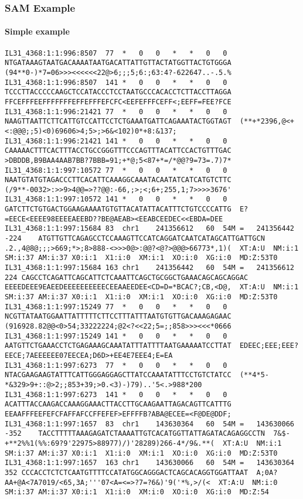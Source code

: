 \documentclass{beamer}
\begin{document}
\begin{frame}[fragile]
\frametitle{SAM Example}
\framesubtitle{Simple example}
\begin{framed}\tiny
\begin{verbatim}
IL31_4368:1:1:996:8507	77	*	0	0	*	*	0	0	NTGATAAAGTAATGACAAAATAATGACATTATTGTTACTATGGTTACTGTGGGA	(94**0-)*7=06>>><<<<<<22@>6;;;5;6:;63:4?-622647..-.5.%
IL31_4368:1:1:996:8507	141	*	0	0	*	*	0	0	TCCCTTACCCCCAAGCTCCATACCCTCCTAATGCCCACACCTCTTACCTTAGGA	FFCEFFFEEFFFFFFFEFFEFFFEFCFC<EEFEFFFCEFF<;EEFF=FEE?FCE
IL31_4368:1:1:996:21421	77	*	0	0	*	*	0	0	NAAGTTAATTCTTCATTGTCCATTCCTCTGAAATGATTCAGAAATACTGGTAGT	(**+*2396,@<+<:@@@;;5)<0)69606>4;5>;>6&<102)0*+8:&137;
IL31_4368:1:1:996:21421	141	*	0	0	*	*	0	0	CAAAAACTTTCACTTTACCTGCCGGGTTTCCCAGTTTACATTCCACTGTTTGAC	>DBDDB,B9BAA4AAB7BB?7BBB=91;+*@;5<87+*=/*@@?9=73=.7)7*
IL31_4368:1:1:997:10572	77	*	0	0	*	*	0	0	NAATGTATGTAGACCCTTCACATTCAAAGGCAAATACAATATCATCATGTCTTC	(/9**-0032>:>>9>4@@=>??@@:-66,;>;<;6+;255,1;7>>>>3676'
IL31_4368:1:1:997:10572	141	*	0	0	*	*	0	0	GATCTTCTGTGACTGGAAGAAAATGTGTTACATATTACATTTCTGTCCCCATTG	E?=EECE<EEEE98EEEEAEEBD??BE@AEAB><EEABCEEDEC<<EBDA=DEE
IL31_4368:1:1:997:15684	83	chr1	241356612	60	54M	=	241356442	-224	ATGTTGTTCAGAGCCTCCAAAGTTCCATCAGGATCAATCATAGCATTGATTGCN	.2.,4@8@;;;>669;*>;8>888-<>>>0@>:@@?<@?>@@@>66773*,1)(	XT:A:U	NM:i:1	SM:i:37	AM:i:37	X0:i:1	X1:i:0	XM:i:1	XO:i:0	XG:i:0	MD:Z:53T0
IL31_4368:1:1:997:15684	163	chr1	241356442	60	54M	=	241356612	224	CAGCCTCAGATTCAGCATTCTCAAATTCAGCTGCGGCTGAAACAGCAGCAGGAC	EEEEDEEE9EAEEDEEEEEEEEEECEEAAEEDEE<CD=D=*BCAC?;CB,<D@,	XT:A:U	NM:i:1	SM:i:37	AM:i:37	X0:i:1	X1:i:0	XM:i:1	XO:i:0	XG:i:0	MD:Z:53T0
IL31_4368:1:1:997:15249	77	*	0	0	*	*	0	0	NCGTTATAATGGAATTATTTTTCTTCCTTTATTTAATGTGTTGACAAAGAGAAC	(916928.82@@<0>54;33222224;@2<?<<22;5=;;858>>><<<*0666
IL31_4368:1:1:997:15249	141	*	0	0	*	*	0	0	AATGTTCTGAAACCTCTGAGAAAGCAAATATTTATTTTAATGAAAAATCCTTAT	EDEEC;EEE;EEE?EECE;7AEEEEEE07EECEA;D6D>+EE4E7EEE4;E=EA
IL31_4368:1:1:997:6273	77	*	0	0	*	*	0	0	NTACGAAGAAGTATTTCATTGGGAGGAGCTTATCCAAATATTTCCTGTCTATCC	(**4*5-*&329>9+::@>2;;853+39;>0.<3)-)79)..'5<.>988*200
IL31_4368:1:1:997:6273	141	*	0	0	*	*	0	0	ACATTTACCAAGACCAAAGGAAACTTACCTTGCAAGAATTAGACAGTTCATTTG	EEAAFFFEEFEFCFAFFAFCCFFEFEF>EFFFFB?ABA@ECEE=<F@DE@DDF;
IL31_4368:1:1:997:1657	83	chr1	143630364	60	54M	=	143630066	-352	TACCTTTTTAAAGAGATCTAAAATTGTCACATGGTTATTAGATACAGAGGCCTN	7&$-+**2%%1(%%:69?9'22975>88977)/)'28289)266-4*/9&.**(	XT:A:U	NM:i:1	SM:i:37	AM:i:37	X0:i:1	X1:i:0	XM:i:1	XO:i:0	XG:i:0	MD:Z:53T0
IL31_4368:1:1:997:1657	163	chr1	143630066	60	54M	=	143630364	352	CCCACCTCTCTCAATGTTTTCCATATGGCAGGGACTCAGCACAGGTGGATTAAT	A;0A?AA+@A<7A7019/<65,3A;'''07<A=<=>?7=?6&)'9('*%,>/(<	XT:A:U	NM:i:0	SM:i:37	AM:i:37	X0:i:1	X1:i:0	XM:i:0	XO:i:0	XG:i:0	MD:Z:54

\end{verbatim}
\end{framed}
\end{frame}
\end{document}
